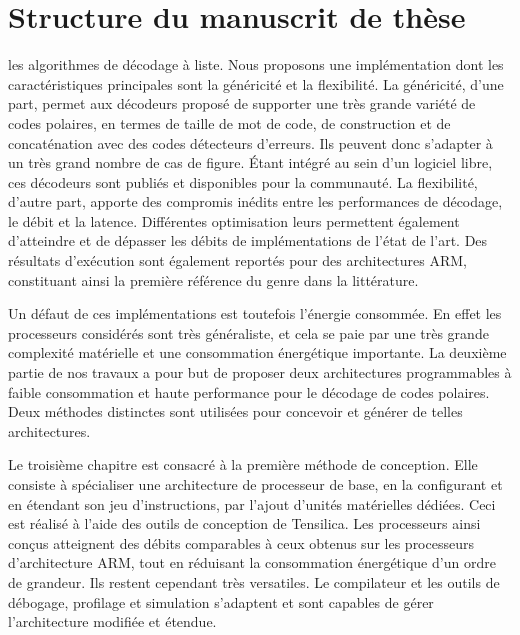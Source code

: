 \section*{Structure du manuscrit de thèse}

les algorithmes de décodage à liste. Nous proposons une implémentation dont les caractéristiques principales sont la généricité et la flexibilité. La généricité, d'une part, permet aux décodeurs proposé de supporter une très grande variété de codes polaires, en termes de taille de mot de code, de construction et de concaténation avec des codes détecteurs d'erreurs. Ils peuvent donc s'adapter à un très grand nombre de cas de figure. \'Etant intégré au sein d'un logiciel libre, ces décodeurs sont publiés et disponibles pour la communauté. La flexibilité, d'autre part, apporte des compromis inédits entre les performances de décodage, le débit et la latence. Différentes optimisation leurs permettent également d'atteindre et de dépasser les débits de implémentations de l'état de l'art. Des résultats d'exécution sont également reportés pour des architectures ARM, constituant ainsi la première référence du genre dans la littérature.

Un défaut de ces implémentations est toutefois l'énergie consommée. En effet les processeurs considérés sont très généraliste, et cela se paie par une très grande complexité matérielle et une consommation énergétique importante. La deuxième partie de nos travaux a pour but de proposer deux architectures programmables à faible consommation et haute performance pour le décodage de codes polaires. Deux méthodes distinctes sont utilisées pour concevoir et générer de telles architectures.

Le troisième chapitre est consacré à la première méthode de conception. Elle consiste à spécialiser une architecture de processeur de base, en la configurant et en étendant son jeu d'instructions, par l'ajout d'unités matérielles dédiées. Ceci est réalisé à l'aide des outils de conception de Tensilica. Les processeurs ainsi conçus atteignent des débits comparables à ceux obtenus sur les processeurs d'architecture ARM, tout en réduisant la consommation énergétique d'un ordre de grandeur. Ils restent cependant très versatiles. Le compilateur et les outils de débogage, profilage et simulation s'adaptent et sont capables de gérer l'architecture modifiée et étendue.

